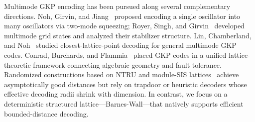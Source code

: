 \documentclass[aps,prl,twocolumn,superscriptaddress]{revtex4-2}
\begin{document}
Multimode GKP encoding has been pursued along several complementary directions. Noh, Girvin, and Jiang~\cite{noh2020} proposed encoding a single oscillator into many oscillators via two-mode squeezing; Royer, Singh, and Girvin~\cite{royer2022} developed multimode grid states and analyzed their stabilizer structure. Lin, Chamberland, and Noh~\cite{lin2023} studied closest-lattice-point decoding for general multimode GKP codes. Conrad, Burchards, and Flammia~\cite{conrad2024lattices} placed GKP codes in a unified lattice-theoretic framework connecting algebraic geometry and fault tolerance. Randomized constructions based on NTRU and module-SIS lattices~\cite{conrad2024,bloemer2026} achieve asymptotically good distances but rely on trapdoor or heuristic decoders whose effective decoding radii shrink with dimension. In contrast, we focus on a deterministic structured lattice---Barnes-Wall---that natively supports efficient bounded-distance decoding.

\end{document}
